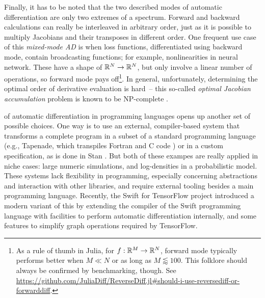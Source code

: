 Finally, it has to be noted that the two described modes of automatic differentiation are only two
extremes of a spectrum.  Forward and backward calculations can really be interleaved in arbitrary
order, just as it is possible to multiply Jacobians and their transposes in different order.  One
frequent use case of this \emph{mixed-mode AD} is when loss functions, differentiated using backward
mode, contain broadcasting functions; for example, nonlinearities in neural network.  These have a
shape of \(\mathbb{R}^N \to \mathbb{R}^N\), but only involve a linear number of operations, so forward mode pays
off\footnote{As a rule of thumb in Julia, for \(f: \mathbb{R}^M \to \mathbb{R}^N\), forward mode typically
  performs better when \(M \ll N\) or as long as \(M \lessapprox 100\).  This folklore should always
  be confirmed by benchmarking, though.  See
  \url{https://github.com/JuliaDiff/ReverseDiff.jl\#should-i-use-reversediff-or-forwarddiff}.}.  In
general, unfortunately, determining the optimal order of derivative evaluation is hard~-- this
so-called \emph{optimal Jacobian accumulation} problem is known to be NP-complete
\parencite{naumann2007optimal}.

 of automatic differentiation in programming languages
opens up another set of possible choices.  One way is to use an external, compiler-based system that
transforms a complete program in a subset of a standard programming language (e.g., Tapenade, which
transpiles Fortran and C code \parencite{tapenadedevelopers2019tapenade}) or in a custom
specification, as is done in Stan \parencite{carpenter2015stan}.  But both of these exampes are
really applied in niche cases: large numeric simulations, and log-densities in a probabilistic
model.  These systems lack flexibility in programming, especially concerning abstractions and
interaction with other libraries, and require external tooling besides a main programming language.
Recently, the Swift for TensorFlow project \parencite{tensorflowdevelopers2018swift,hong2018graph}
introduced a modern variant of this by extending the compiler of the Swift programming language with
facilities to perform automatic differentiation internally, and some features to simplify graph
operations required by TensorFlow.

